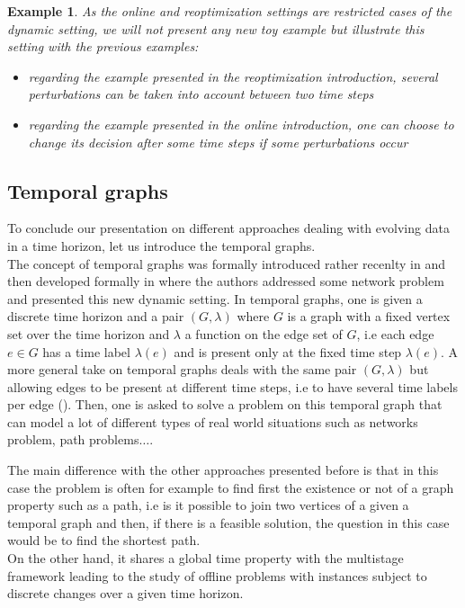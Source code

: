 \documentclass[a4paper]{book}
\newtheorem{ex}{Example}[chapter]
\begin{document}
\begin{ex}


As the \textit{online} and reoptimization settings are restricted cases of the dynamic setting, we will not present any new toy example but illustrate this setting with the previous examples:
\begin{itemize}
    \item regarding the example presented in the  reoptimization introduction, several perturbations can be taken into account between two time steps
    \item regarding the example presented in the \textit{online} introduction, one can choose to change its decision after some time steps if some perturbations occur
\end{itemize}

\end{ex}





\subsection{Temporal graphs}

To conclude our presentation on different approaches dealing with evolving data in a time horizon, let us introduce the temporal graphs. \\
The concept of temporal graphs was formally introduced rather recenlty in \cite{Berman96} and then developed formally in \cite{KempeKK00} where the authors addressed some network problem and presented this new dynamic setting. In temporal graphs, one is given a discrete time horizon and a pair $(G,\lambda)$ where $G$ is a graph with a fixed vertex set over the time horizon and $\lambda$ a function on the edge set of $G$, i.e each edge $e \in G$ has a time label $\lambda(e)$ and is present only at the fixed time step $\lambda(e)$. A more general take on temporal graphs deals with the same pair $(G,\lambda)$ but allowing edges to be present at different time steps, i.e to have several time labels per edge (\cite{MertziosMS19}). Then, one is asked to solve a problem on this temporal graph that can model a lot of different types of real world situations such as networks problem, path problems$\ldots$. 

The main difference with the other approaches presented before is that in this case the problem is often for example to find first the existence or not of a graph property such as a path, i.e is it possible to join two vertices of a given a temporal graph and then, if there is a feasible solution, the question in this case would be to find the shortest path. \\
On the other hand, it shares a global time property with the multistage framework leading to the study of offline problems with instances subject to discrete changes over a given time horizon.\\
\end{document}
